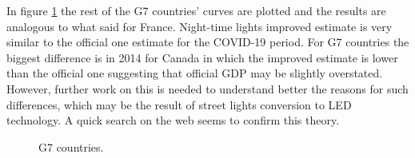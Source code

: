 
In figure \ref{fig:g7countries} the rest of the G7 countries' curves are plotted and the results are analogous to what said for France. Night-time lights improved estimate is very similar to the official one estimate for the COVID-19 period.
For G7 countries the biggest difference is in 2014 for Canada in which the improved estimate is lower than the official one suggesting that official GDP may be slightly overstated. However, further work on this is needed to understand better the reasons for such differences, which may be the result of street lights conversion to LED technology. A quick search on the web seems to confirm this theory.
\begin{figure}
    \centering
    \hspace*{-2.8cm}
    \quad
    \hspace*{-2.8cm}
    \quad
    \hspace*{-2.8cm}
    \caption{G7 countries.}%
    \label{fig:g7countries}
\end{figure}

